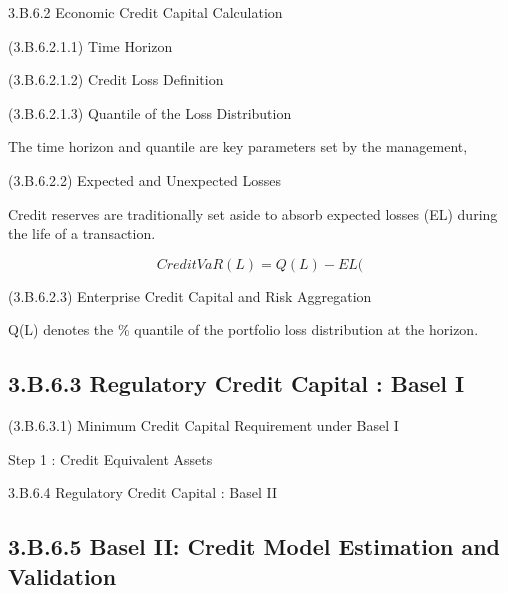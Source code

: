 3.B.6.2 Economic Credit Capital Calculation

(3.B.6.2.1.1) Time Horizon

(3.B.6.2.1.2) Credit Loss Definition

(3.B.6.2.1.3) Quantile of the Loss Distribution


The time horizon and quantile are key parameters set by the management,


(3.B.6.2.2) Expected and Unexpected Losses

Credit reserves are traditionally set aside to absorb expected losses (EL) during the life of a transaction.

 

 

\[CreditVaR(L) =Q(L) - EL(\]


(3.B.6.2.3) Enterprise Credit Capital and Risk Aggregation

 


 

Q(L) denotes the \% quantile of the portfolio loss distribution at the horizon.

 

 
\newpage
\subsection*{3.B.6.3 Regulatory Credit Capital : Basel I}

 

(3.B.6.3.1) Minimum Credit Capital Requirement under Basel I 

Step 1 : Credit Equivalent Assets

 

 

3.B.6.4 Regulatory Credit Capital : Basel II

 

 

\subsection*{3.B.6.5 Basel II:  Credit Model Estimation and Validation}


